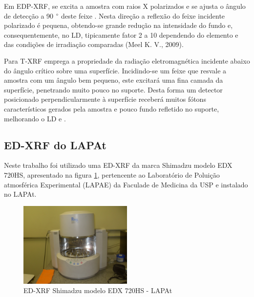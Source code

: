 Em EDP-XRF, se excita a amostra com raios X polarizados e se ajusta o ângulo 
de detecção a 90 $\degree$ deste feixe \cite{dzubay1974}. Nesta direção a 
reflexão do feixe incidente polarizado é pequena, obtendo-se grande redução 
na intensidade do fundo e, consequentemente, no LD, tipicamente fator 2 a 10
dependendo do elemento e das condições de irradiação comparadas 
(Meel K. V., 2009).


Para T-XRF emprega a propriedade da radiação eletromagnética incidente abaixo do
ângulo crítico sobre uma superfície. Incidindo-se um feixe que resvale a amostra
com um ângulo bem pequeno, este excitará uma fina camada da superfície, 
penetrando muito pouco no suporte. Desta forma um detector posicionado 
perpendicularmente à superfície receberá muitos fótons característicos gerados 
pela amostra e pouco fundo refletido no suporte, melhorando o LD
\citep{yoneda1971} e \citep{aiginger1974}.

\subsection{\textbf{ED-XRF} do \textbf{LAPAt}}


Neste trabalho foi utilizado uma ED-XRF da marca Shimadzu modelo EDX 720HS, 
apresentado na figura \ref{fig:xrfed_iag},
pertencente ao Laboratório de Poluição atmosférica Experimental (LAPAE) 
da Faculade de Medicina da USP e instalado no LAPAt. 

\begin{figure}[H]
  \centering
  \includegraphics[width=0.5\textwidth]{../inputs/images/xrf-ed-IAG-USP.jpg}
  \caption{ED-XRF Shimadzu modelo EDX 720HS - LAPAt \label{fig:xrfed_iag}}
\end{figure}

